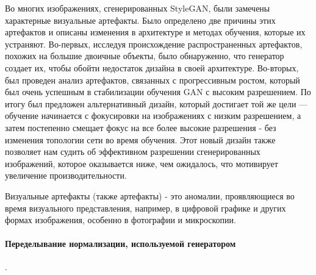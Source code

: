 Во многих изображениях, сгенерированных StyleGAN,  были замечены характерные визуальные артефакты. Было определено две причины этих артефактов и описаны изменения в архитектуре и методах обучения, которые их устраняют. Во-первых, исследуя происхождение распространенных артефактов, похожих на большие двоичные объекты, было обнаруженно, что генератор создает их, чтобы обойти недостаток дизайна в своей архитектуре. Во-вторых, был проведен анализ артефактов, связанных с прогрессивным ростом\cite{progressive_growing_of_gans}, который был очень успешным в стабилизации обучения GAN с высоким разрешением. По итогу был предложен альтернативный дизайн, который достигает той же цели — обучение начинается с фокусировки на изображениях с низким разрешением, а затем постепенно смещает фокус на все более высокие разрешения - без изменения топологии сети во время обучения. Этот новый дизайн также позволяет нам судить об эффективном разрешении сгенерированных изображений, которое оказывается ниже, чем ожидалось, что мотивирует увеличение производительности.\cite{StyleGAN2}

\begin{definition}
    Визуальные артефакты (также артефакты) - это аномалии, проявляющиеся во время визуального представления, например, в цифровой графике и других формах изображения, особенно в фотографии и микроскопии.
\end{definition}

\paragraph{Переделывание нормализации, используемой генератором}.

